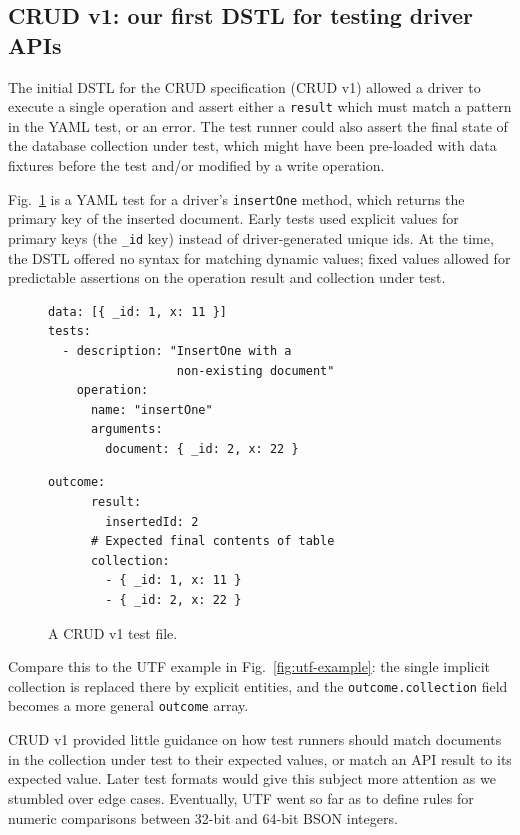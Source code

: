 \documentclass[conference]{IEEEtran}
\begin{document}
\subsection{CRUD v1: our first DSTL for testing driver APIs}

The initial DSTL for the CRUD specification (CRUD v1) allowed a driver to execute a single operation and assert either a \texttt{result} which must match a pattern in the YAML test, or an error. The test runner could also assert the final state of the database collection under test, which might have been pre-loaded with data fixtures before the test and/or modified by a write operation.

Fig.~\ref{fig:crud-v1-example} is a YAML test for a driver's \texttt{insertOne} method, which returns the primary key of the inserted document. Early tests used explicit values for primary keys (the \texttt{\_id} key) instead of driver-generated unique ids. At the time, the DSTL offered no syntax for matching dynamic values; fixed values allowed for predictable assertions on the operation result and collection under test.

\begin{figure}[t]
\begin{minipage}[t]{0.48\textwidth}
\begin{Verbatim}[fontsize=\small, frame=single]
data: [{ _id: 1, x: 11 }]
tests:
  - description: "InsertOne with a
                  non-existing document"
    operation:
      name: "insertOne"
      arguments:
        document: { _id: 2, x: 22 }
\end{Verbatim}
\end{minipage}
\begin{minipage}[t]{0.48\textwidth}
\begin{Verbatim}[fontsize=\small, frame=single]
    outcome:
      result:
        insertedId: 2
      # Expected final contents of table
      collection:
        - { _id: 1, x: 11 }
        - { _id: 2, x: 22 }

\end{Verbatim}
\end{minipage}
\caption{A CRUD v1 test file.}
\label{fig:crud-v1-example}
\end{figure}

Compare this to the UTF example in Fig.~\ref{fig:utf-example}: the single implicit collection is replaced there by explicit entities, and the \texttt{outcome.collection} field becomes a more general \texttt{outcome} array.

CRUD v1 provided little guidance on how test runners should match documents in the collection under test to their expected values, or match an API result to its expected value. Later test formats would give this subject more attention as we stumbled over edge cases. Eventually, UTF went so far as to define rules for numeric comparisons between 32-bit and 64-bit BSON integers.
\end{document}
